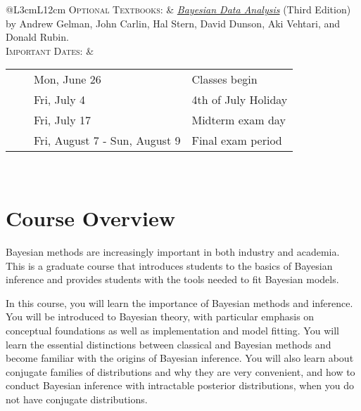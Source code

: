 \documentclass[11pt, a4paper]{article}
\newcommand{\tabitem}{~~\llap{\textbullet}~~}
\begin{document}
\begin{center}
\begin{minipage}[t]{.9\textwidth}
\begin{tabular}{@{}L{3cm}L{12cm}}
\textsc{Optional Textbooks:}	& \href{http://www.amazon.com/Bayesian-Analysis-Chapman-Statistical-Science/dp/1439840954/}{\textit{Bayesian Data Analysis}} (Third Edition) by Andrew Gelman, John Carlin, Hal Stern, David Dunson, Aki Vehtari, and Donald Rubin. \\
\textsc{Important Dates:} & \begin{minipage}[t]{.9\textwidth}
													\begin{tabular}{@{}ll}
														\tabitem Mon, June 26 & Classes begin \\
														\tabitem Fri, July 4 & 4th of July Holiday \\
														\tabitem Fri, July 17 & Midterm exam day \\
														\tabitem Fri, August 7 - Sun, August 9 & Final exam period \\
													\end{tabular}
													\end{minipage} \\
	 \bottomrule[0.065cm]
\end{tabular}
\end{minipage}
\end{center}





\vspace{.5cm}
\setlength{\unitlength}{1in}
\renewcommand{\arraystretch}{1.5}



\section{Course Overview}
Bayesian methods are increasingly important in both industry and academia. This is a graduate course that introduces students to the basics of Bayesian inference and provides students with the tools needed to fit Bayesian models.

In this course, you will learn the importance of Bayesian methods and inference. You will be introduced to Bayesian theory, with particular emphasis on conceptual foundations as well as implementation and model fitting. You will learn the essential distinctions between classical and Bayesian methods and become familiar with the origins of Bayesian inference. You will also learn about conjugate families of distributions and why they are very convenient, and how to conduct Bayesian inference with intractable posterior distributions,  when you do not have conjugate distributions.
\end{document}

